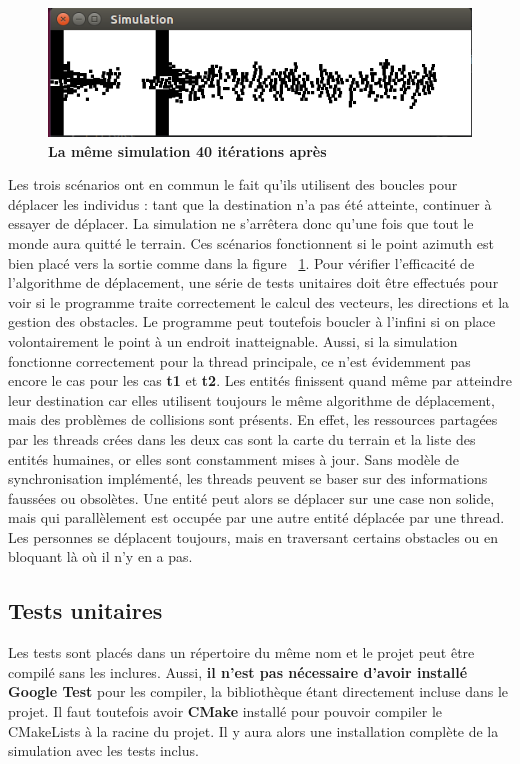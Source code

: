 \documentclass[11pt]{article} %
\begin{document}
\begin{figure}[h]
\caption{\label{f2} \textbf{La même simulation 40 itérations après}}
  \centering
\includegraphics[width=12cm]{graph2}
\end{figure}

Les trois scénarios ont en commun le fait qu'ils utilisent des boucles pour déplacer les individus : tant que la destination n'a pas été atteinte, continuer à essayer de déplacer. La simulation ne s'arrêtera donc qu'une fois que tout le monde aura quitté le terrain. Ces scénarios fonctionnent si le point azimuth est bien placé vers la sortie comme dans la figure ~\ref{f2}. 
Pour vérifier l'efficacité de l'algorithme de déplacement, une série de tests unitaires doit être effectués pour voir si le programme traite correctement le calcul des vecteurs, les directions et la gestion des obstacles. 
Le programme peut toutefois boucler à l'infini si on place volontairement le point à un endroit inatteignable.
Aussi, si la simulation fonctionne correctement pour la thread principale, ce n'est évidemment pas encore le cas pour les cas \textbf{t1} et \textbf{t2}. Les entités finissent quand même par atteindre leur destination car elles utilisent toujours le même algorithme de déplacement, mais des problèmes de collisions sont présents. 
En effet, les ressources partagées par les threads crées dans les deux cas sont la carte du terrain et la liste des entités humaines, or elles sont constamment mises à jour. Sans modèle de synchronisation implémenté, les threads peuvent se baser sur des informations faussées ou obsolètes. Une entité peut alors se déplacer sur une case non solide, mais qui parallèlement est occupée par une autre entité déplacée par une thread. Les personnes se déplacent toujours, mais en traversant certains obstacles ou en bloquant là où il n'y en a pas.

\subsection{Tests unitaires}
Les tests sont placés dans un répertoire du même nom et le projet peut être compilé sans les inclures. Aussi, \textbf{il n'est pas nécessaire d'avoir installé Google Test} pour les compiler, la bibliothèque étant directement incluse dans le projet. Il faut toutefois avoir \textbf{CMake} installé pour pouvoir compiler le CMakeLists à la racine du projet. Il y aura alors une installation complète de la simulation avec les tests inclus. \\
\end{document}
